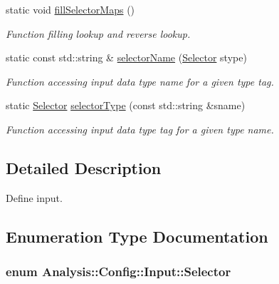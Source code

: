 \begin{DoxyCompactItemize}
static void \hyperlink{namespaceAnalysis_1_1Config_1_1Input_a2e06dcb1733ba407a5398c4a4bc0a43f}{fill\+Selector\+Maps} ()
\begin{DoxyCompactList}\small\item\em Function filling lookup and reverse lookup. \end{DoxyCompactList}\item 
static const std\+::string \& \hyperlink{namespaceAnalysis_1_1Config_1_1Input_aa5d9fccd604bbebe94b3ce68f9a5fbe7}{selector\+Name} (\hyperlink{namespaceAnalysis_1_1Config_1_1Input_a4fbe1ba2d37856e6b9784b4999d5268a}{Selector} stype)
\begin{DoxyCompactList}\small\item\em Function accessing input data type name for a given type tag. \end{DoxyCompactList}\item 
static \hyperlink{namespaceAnalysis_1_1Config_1_1Input_a4fbe1ba2d37856e6b9784b4999d5268a}{Selector} \hyperlink{namespaceAnalysis_1_1Config_1_1Input_aab66e95b8ef82678b43dbab59db6ce0e}{selector\+Type} (const std\+::string \&sname)
\begin{DoxyCompactList}\small\item\em Function accessing input data type tag for a given type name. \end{DoxyCompactList}\end{DoxyCompactItemize}


\subsection{Detailed Description}
Define input. 

\subsection{Enumeration Type Documentation}
\subsubsection[{\texorpdfstring{Selector}{Selector}}]{\setlength{\rightskip}{0pt plus 5cm}enum {\bf Analysis\+::\+Config\+::\+Input\+::\+Selector}}\hypertarget{namespaceAnalysis_1_1Config_1_1Input_a4fbe1ba2d37856e6b9784b4999d5268a}{}\label{namespaceAnalysis_1_1Config_1_1Input_a4fbe1ba2d37856e6b9784b4999d5268a}


